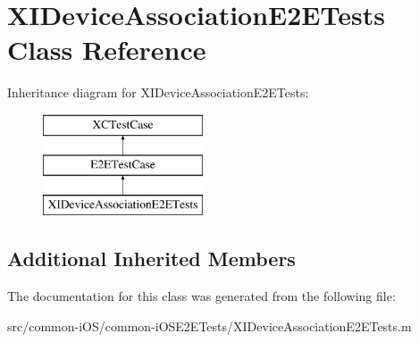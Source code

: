 \hypertarget{interface_x_i_device_association_e2_e_tests}{}\section{X\+I\+Device\+Association\+E2\+E\+Tests Class Reference}
\label{interface_x_i_device_association_e2_e_tests}
Inheritance diagram for X\+I\+Device\+Association\+E2\+E\+Tests\+:\begin{figure}[H]
\begin{center}
\leavevmode
\includegraphics[height=3.000000cm]{interface_x_i_device_association_e2_e_tests}
\end{center}
\end{figure}
\subsection*{Additional Inherited Members}


The documentation for this class was generated from the following file\+:\begin{DoxyCompactItemize}
\item 
src/common-\/i\+O\+S/common-\/i\+O\+S\+E2\+E\+Tests/X\+I\+Device\+Association\+E2\+E\+Tests.\+m\end{DoxyCompactItemize}
